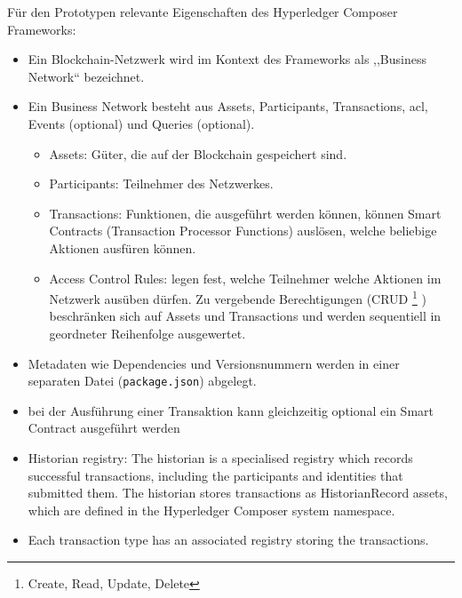         \noindent Für den Prototypen relevante Eigenschaften des Hyperledger Composer Frameworks:
        \begin{itemize}[noitemsep]
            \item Ein Blockchain-Netzwerk wird im Kontext des Frameworks als ,,Business Network`` bezeichnet. 
            \item Ein Business Network besteht aus Assets, Participants, Transactions, \gls{acl}, Events (optional) und Queries (optional).
                \begin{itemize}[noitemsep]
                    \item Assets: Güter, die auf der Blockchain gespeichert sind.
                    \item Participants: Teilnehmer des Netzwerkes.
                    \item Transactions: Funktionen, die ausgeführt werden können, können Smart Contracts (Transaction Processor Functions) auslösen, welche beliebige Aktionen ausfüren können. 
                    \item Access Control Rules: legen fest, welche Teilnehmer welche Aktionen im Netzwerk ausüben dürfen. 
                        Zu vergebende Berechtigungen (CRUD
                        \!\footnote{Create, Read, Update, Delete}
                        ) beschränken sich auf Assets und Transactions und werden sequentiell in geordneter Reihenfolge ausgewertet. 
                \end{itemize}
            \item Metadaten wie Dependencies und Versionsnummern werden in einer separaten Datei (\colorbox{light-gray}{\lstinline|package.json|}) abgelegt.
            \item bei der Ausführung einer Transaktion kann gleichzeitig optional ein Smart Contract ausgeführt werden
            \item Historian registry: The historian is a specialised registry which records successful transactions, including the participants and identities that submitted them. 
            The historian stores transactions as HistorianRecord assets, which are defined in the Hyperledger Composer system namespace.
            \item Each transaction type has an associated registry storing the transactions.
        \end{itemize}
        
